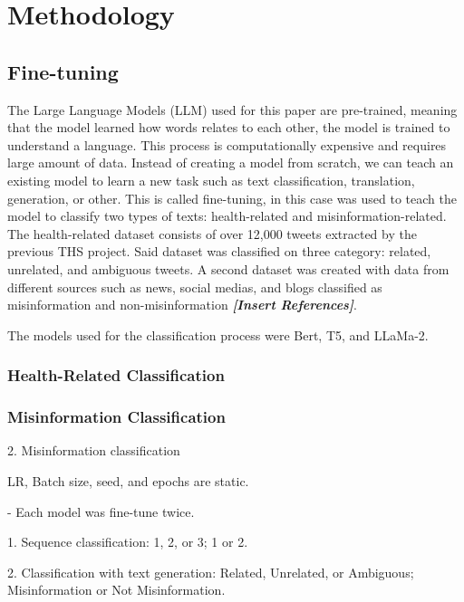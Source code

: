 \documentclass[chapters]{IEEEtran}
\begin{document}
\section{Methodology}

\subsection{Fine-tuning}

The Large Language Models (LLM) used for this paper are pre-trained, meaning that the model learned how words relates to each other, the model is trained to understand a language. This process is computationally expensive and requires large amount of data. Instead of creating a model from scratch, we can teach an existing model to learn a new task such as text classification, translation, generation, or other. This is called fine-tuning, in this case was used to teach the model to classify two types of texts: health-related and misinformation-related. 
\newline
\newline
The health-related dataset consists of over 12,000 tweets extracted by the previous THS project. Said dataset was classified on three category: related, unrelated, and ambiguous tweets. A second dataset was created with data from different sources such as news, social medias, and blogs classified as misinformation and non-misinformation \textbf{\textit{[Insert References]}}. 

The models used for the classification process were Bert, T5, and LLaMa-2. 

\subsubsection{Health-Related Classification}


\subsubsection{Misinformation Classification}


2. Misinformation classification

LR, Batch size, seed, and epochs are static.

- Each model was fine-tune twice.

    1. Sequence classification: 1, 2, or 3; 1 or 2.

    2. Classification with text generation: Related, Unrelated, or Ambiguous; Misinformation or Not Misinformation.
\end{document}
